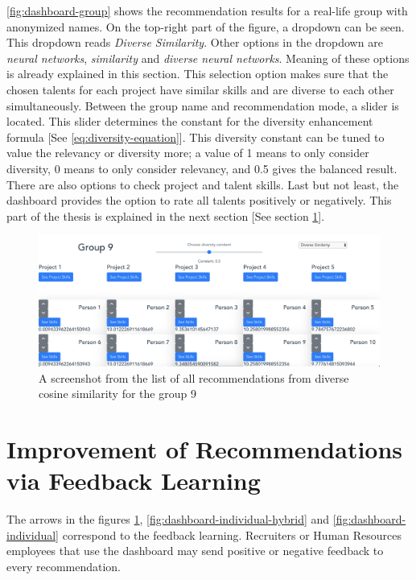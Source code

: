 \autoref{fig:dashboard-group} shows the recommendation results for a real-life group with anonymized names. On the top-right part of the figure, a dropdown can be seen. This dropdown reads \textit{Diverse Similarity}. Other options in the dropdown are \textit{neural networks}, \textit{similarity} and \textit{diverse neural networks}. Meaning of these options is already explained in this section. This selection option makes sure that the chosen talents for each project have similar skills and are diverse to each other simultaneously. Between the group name and recommendation mode, a slider is located. This slider determines the constant for the diversity enhancement formula [See \eqref{eq:diversity-equation}]. This diversity constant can be tuned to value the relevancy or diversity more; a value of 1 means to only consider diversity, 0 means to only consider relevancy, and 0.5 gives the balanced result. There are also options to check project and talent skills. Last but not least, the dashboard provides the option to rate all talents positively or negatively. This part of the thesis is explained in the next section [See section \ref{section:feedback-learning}].

\begin{figure}[htp]
	\centering
	\includegraphics[width=\textwidth]{figures/DashboardGroup.png}
	\caption{A screenshot from the list of all recommendations from diverse cosine similarity for the group 9}
	\label{fig:dashboard-group}
\end{figure}




\section{Improvement of Recommendations via Feedback Learning}\label{section:feedback-learning}

The arrows in the figures \ref{fig:dashboard-group}, \ref{fig:dashboard-individual-hybrid} and \ref{fig:dashboard-individual} correspond to the feedback learning. Recruiters or Human Resources employees that use the dashboard may send positive or negative feedback to every recommendation. 

